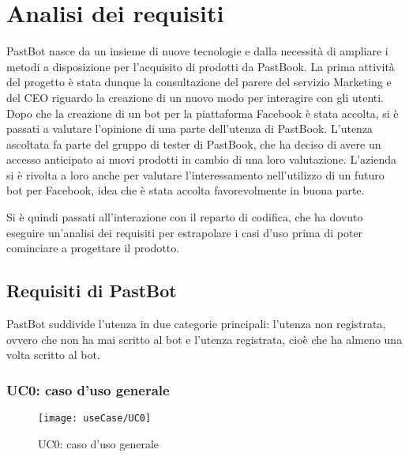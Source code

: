 
\chapter{Analisi dei requisiti}

PastBot nasce da un insieme di nuove tecnologie e dalla necessità di ampliare i
metodi a disposizione per l'acquisito di prodotti da PastBook.
La prima attività del progetto è stata dunque la consultazione del parere del
servizio Marketing e del CEO riguardo la creazione di un nuovo modo per
interagire con gli utenti. Dopo che la creazione di un bot per la piattaforma
Facebook è stata accolta, si è passati a valutare l'opinione di una parte
dell'utenza di PastBook. L'utenza ascoltata fa parte del gruppo di tester di
PastBook, che ha deciso di avere un accesso anticipato ai nuovi prodotti in
cambio di una loro valutazione. L'azienda si è rivolta a loro anche per valutare
l'interessamento nell'utilizzo di un futuro bot per Facebook, idea che è stata
accolta favorevolmente in buona parte.

Si è quindi passati all'interazione con il reparto di codifica, che ha dovuto
eseguire un'analisi dei requisiti per estrapolare i casi d'uso prima di poter
cominciare a progettare il prodotto.

\section{Requisiti di PastBot}

PastBot suddivide l'utenza in due categorie principali:
l'utenza non registrata, ovvero che non ha mai scritto al bot e
l'utenza registrata, cioè che ha almeno una volta scritto al bot.

\subsection{UC0: caso d'uso generale}
\label{uc:uc0}

\begin{figure}[H]
  \centering
  \texttt{[image: useCase/UC0]}
  \caption{UC0: caso d'uso generale}
\end{figure}

